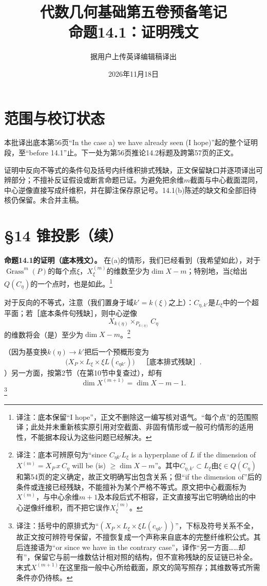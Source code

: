 \documentclass[openany,fontset=fandol]{ctexbook}
\newcommand{\note}[1]{\footnote{译注：#1}}
\begin{document}
\title{代数几何基础第五卷预备笔记\\命题14.1：证明残文}
\author{据用户上传英译编辑稿译出}
\date{2026年11月18日}
\maketitle
\chapter*{范围与校订状态}
本批译出底本第56页“In the case a) we have already seen (I hope)”起的整个证明段，至“before 14.1”止。下一处为第56页推论14.2标题及跨第57页的正文。

证明中反向不等式的条件句及括号内纤维积排式残缺，正文保留缺口并逐项译出可辨部分；不擅补反证假设或断言命题已证。为避免把余维$m$截面与中心截面混同，中心逆像直接写成纤维积，并在脚注保存原记号。14.1(b)陈述的缺文和全部旧待核仍保留。未合并主稿。
\chapter*{§14 锥投影（续）}
\noindent\textbf{命题14.1的证明（底本残文）。}
在(a)的情形，我们已经看到（我希望如此），对于$\operatorname{Grass}^{m}(P)$的每个点$\xi$，$X^{(m)}_\xi$的维数至少为$\dim X-m$；特别地，当$\xi$给出$Q(C_\eta)$的一个点时，也是如此。\note{底本保留“I hope”，正文不删除这一编写核对语气。“每个点”的范围照译；此处并未重新核实原引用对空截面、非固有情形或一般可约情形的适用性，不能据本段认为这些问题已经解决。}

对于反向的不等式，注意（我们置身于域$k'=k(\xi)$之上）：$C_{\eta,k'}$是$L_\xi$中的一个超平面；若［底本条件句残缺］，则中心逆像
\[
X_{k(\eta)}\times_{P_{k(\eta)}}C_\eta
\]
的维数将会（是）至少为$\dim X-m$。\note{底本可辨原句为“since $C_{\eta k'}L_\xi$ is a hyperplane of $L$ if the dimension of $X^{(m)}=X_P\,x\,C_\eta$ will be (is) $\geq\dim X-m$”。其中$C_{\eta,k'}\subset L_\xi$由$\xi\in Q(C_\eta)$和第54页的定义确定，故正文明确写出包含关系；但“if the dimension of”后的条件或连接已经残缺，不能擅补为某个严格不等式。原文把中心截面标为$X^{(m)}$，与中心余维$m+1$及本段后式不相容，正文直接写出它明确给出的中心逆像纤维积，而不把它误作$X^{(m)}_\xi$。}

（因为基变换$k(\eta)\to k'$把后一个预概形变为
\[
\bigl(X_P\times L_\xi\times\xi L(c_{\eta k'})\bigr)
\quad\text{［底本排式残缺］}.
\]
）另一方面，按第2节（在第10节中复查过），却有
\[
\dim X^{(m+1)}=\dim X-m-1.
\]
\note{括号中的原排式为“$(X_P\times L_\xi\times\xi L(c_{\eta k'}))$”，下标及符号关系不全，故正文按可辨符号保留，不擅恢复成一个声称来自底本的完整纤维积公式。其后连接语为“or since we have in the contrary case”，译作“另一方面……却有”，保留它与前一维数估计相对照的结构，但不宣称残缺的反证链已补全。末式$X^{(m+1)}$在这里指一般中心所给截面，原文的简写照存；其维数等式所需条件亦仍待核。}
\end{document}
